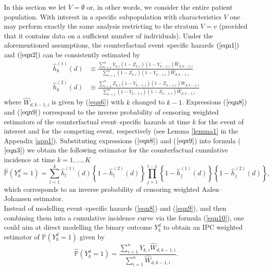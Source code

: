 \documentclass[12pt]{article}
\begin{document}
In this section we let $V = \emptyset$ or, in other words, we consider the entire patient population. With interest in a specific subpopulation with characteristics $V$ one may perform exactly the same analysis restricting to the stratum $V = v$ (provided that it contains data on a sufficient number of individuals). Under the aforementioned assumptions, the counterfactual event--specific hazards $(\ref{eqn1})$ and $(\ref{eqn2})$ can be consistently estimated by
\begin{align}
\label{eqn8}
\hat{h}_{k}^{(1)} \left(d \right) &\equiv \frac{\sum_{i=1}^n Y_{k, i} \left(1 - Z_{k, i} \right) \left(1 - Y_{k-1, i} \right) \hat{W}_{d, k-1, i} }{\sum_{i=1}^n \left(1 - Z_{k, i} \right) \left(1 - Y_{k-1, i} \right) \hat{W}_{d, k-1, i} } \\
\label{eqn9}
\hat{h}_{k}^{(2)} \left(d \right) &\equiv \frac{\sum_{i=1}^n Z_{k, i} \left(1 - Y_{k-1, i} \right) \left(1 - Z_{k-1, i} \right) \hat{W}_{d, k-1, i}}{\sum_{i=1}^n \left(1 - Y_{k-1, i} \right) \left(1 - Z_{k-1, i} \right) \hat{W}_{d, k-1, i}}
\end{align}
where $\hat{W}_{d, k-1, i}$ is given by (\ref{eqn6}) with $k$ changed to $k-1$. Expressions ($\ref{eqn8}$) and ($\ref{eqn9}$) correspond to the inverse probability of censoring weighted estimators of the counterfactual event--specific hazards at time $k$ for the event of interest and for the competing event, respectively (see Lemma \ref{lemma1} in the Appendix \ref{app1}). Substituting expressions ($\ref{eqn8}$) and ($\ref{eqn9}$) into formula ($\ref{eqn3}$) we obtain the following estimator for the counterfactual cumulative incidence at time $k = 1, \dots, K$
\begin{equation}
\label{eqn10}
\hat{\mathbb{P}} \left( Y_k^d = 1 \right) = \sum_{l=1}^{k} \hat{h}_l^{(1)} \left(d \right) \left\lbrace 1 - \hat{h}_l^{(2)} \left(d \right) \right\rbrace \prod_{j=1}^{l-1} \left\lbrace 1-\hat{h}_j^{(1)} \left(d \right) \right\rbrace \left\lbrace 1-\hat{h}_j^{(2)} \left(d \right) \right\rbrace,
\end{equation}
which corresponds to an inverse probability of censoring weighted Aalen--Johansen estimator.
\\
\indent
Instead of modelling event--specific hazards (\ref{eqn8}) and (\ref{eqn9}), and then combining them into a cumulative incidence curve via the formula (\ref{eqn10}), one could aim at direct modelling the binary outcome $Y_k^d$ to obtain an IPC weighted estimator of $\mathbb{P} \left( Y_k^d = 1 \right)$ given by
\begin{equation*}
\hat{\mathbb{P}} \left( Y_k^d = 1 \right) = \frac{ \sum_{ i=1 }^{n} Y_{k,i} \hat{W}_{d, k-1, i} }{ \sum_{ i=1 }^{n} \hat{W}_{d, k-1, i} }.
\end{equation*}
\end{document}
